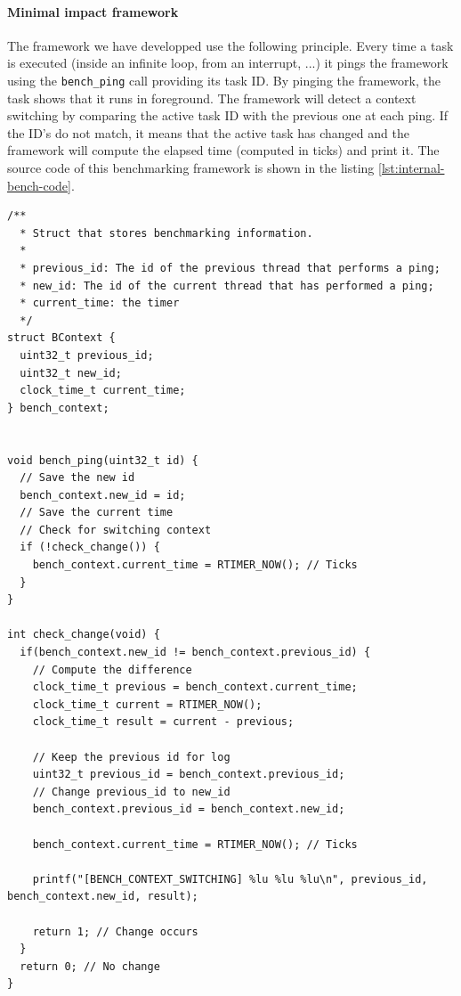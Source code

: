 \paragraph{Minimal impact framework}
The framework we have developped use the following principle.
Every time a task is executed (inside an infinite loop, from an interrupt, ...) it pings the framework using the \texttt{bench\_ping} call providing its task ID.
By pinging the framework, the task shows that it runs in foreground.
The framework will detect a context switching by comparing the active task ID with the previous one at each ping.
If the ID's do not match, it means that the active task has changed and the framework will compute the elapsed time (computed in ticks) and print it.
The source code of this benchmarking framework is shown in the listing \ref{lst:internal-bench-code}.

\begin{lstlisting}[style=CStyle, label={lst:internal-bench-code}, caption={Source code of the benchmarking framework implemented in Contiki}]
/**
  * Struct that stores benchmarking information.
  * 
  * previous_id: The id of the previous thread that performs a ping;
  * new_id: The id of the current thread that has performed a ping;
  * current_time: the timer
  */
struct BContext {
  uint32_t previous_id;
  uint32_t new_id;
  clock_time_t current_time;
} bench_context;


void bench_ping(uint32_t id) {
  // Save the new id
  bench_context.new_id = id;
  // Save the current time
  // Check for switching context
  if (!check_change()) {
    bench_context.current_time = RTIMER_NOW(); // Ticks
  }
}

int check_change(void) {
  if(bench_context.new_id != bench_context.previous_id) {
    // Compute the difference
    clock_time_t previous = bench_context.current_time;
    clock_time_t current = RTIMER_NOW();
    clock_time_t result = current - previous;

    // Keep the previous id for log
    uint32_t previous_id = bench_context.previous_id;
    // Change previous_id to new_id
    bench_context.previous_id = bench_context.new_id;

    bench_context.current_time = RTIMER_NOW(); // Ticks

    printf("[BENCH_CONTEXT_SWITCHING] %lu %lu %lu\n", previous_id, bench_context.new_id, result);
    
    return 1; // Change occurs
  }
  return 0; // No change
}
\end{lstlisting}


